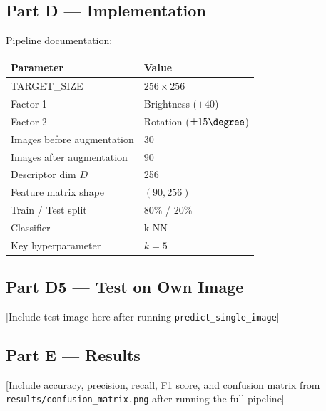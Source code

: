 \documentclass[12pt]{article}
\begin{document}
\subsection*{Part D --- Implementation}

Pipeline documentation:

\begin{center}
\begin{tabular}{ll}
\hline
\textbf{Parameter} & \textbf{Value} \\
\hline
TARGET\_SIZE & $256 \times 256$ \\
Factor 1 & Brightness ($\pm 40$) \\
Factor 2 & Rotation ($\pm 15\degree$) \\
Images before augmentation & 30 \\
Images after augmentation & 90 \\
Descriptor dim $D$ & 256 \\
Feature matrix shape & $(90, 256)$ \\
Train / Test split & 80\% / 20\% \\
Classifier & k-NN \\
Key hyperparameter & $k = 5$ \\
\hline
\end{tabular}
\end{center}

\subsection*{Part D5 --- Test on Own Image}

[Include test image here after running \texttt{predict\_single\_image}]

\subsection*{Part E --- Results}

[Include accuracy, precision, recall, F1 score, and confusion matrix from \texttt{results/confusion\_matrix.png} after running the full pipeline]
\end{document}
